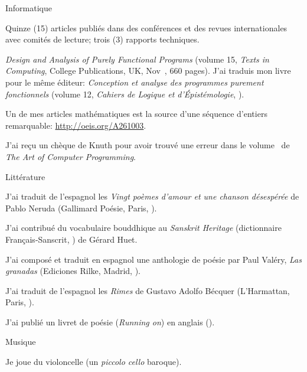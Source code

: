 \documentclass[a4paper,11pt]{article}
\begin{document}
\bigskip
\noindent Informatique
\begin{itemize*}

  \item Quinze (15) articles publiés dans des conférences et des
    revues internationales avec comités de lecture; trois (3) rapports
    techniques.

  \item \textit{Design and Analysis of Purely Functional Programs}
    (volume 15, \emph{Texts in Computing}, College Publications, UK,
    Nov~, 660 pages). J'ai traduis mon livre pour
    le même éditeur: \textit{Conception et analyse des programmes
      purement fonctionnels} (volume 12, \emph{Cahiers de Logique et
    d'Épistémologie}, ).

  \item Un de mes articles mathématiques est la source d'une séquence
    d'entiers remarquable: \url{http://oeis.org/A261003}.

  \item J'ai reçu un chèque de Knuth pour avoir trouvé une erreur dans
    le volume~ de \emph{The Art of Computer
    Programming}.

\end{itemize*}

\noindent Littérature
\begin{itemize*}

  \item J'ai traduit de l'espagnol les \textit{Vingt poèmes
    d'amour et une chanson désespérée} de Pablo Neruda (Gallimard
    Poésie, Paris, ).

  \item J'ai contribué du vocabulaire bouddhique au \emph{Sanskrit
    Heritage} (dictionnaire Français-Sanscrit, ) de
    Gérard Huet. %

  \item J'ai composé et traduit en espagnol une anthologie de poésie
    par Paul Valéry, \emph{Las granadas} (Ediciones Rilke, Madrid,
    ).

  \item J'ai traduit de l'espagnol les \textit{Rimes} de Gustavo
    Adolfo B\'ecquer (L'Harmattan, Paris, ).

  \item J'ai publié un livret de poésie (\textit{Running on}) en
    anglais ().

\end{itemize*}

\noindent Musique
\begin{itemize*}

  \item Je joue du violoncelle (un \emph{piccolo cello} baroque).

\end{itemize*}



%
\nocite{*}
\end{document}
